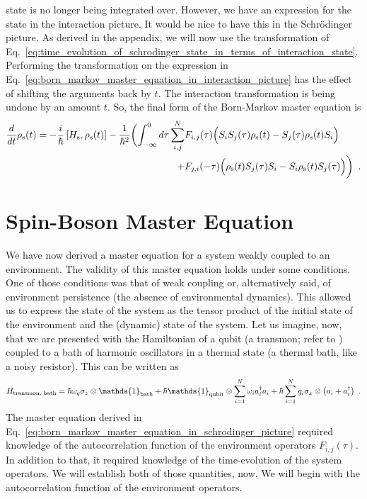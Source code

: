 \documentclass{article}
\begin{document}
state is no longer being integrated over. However, we have an expression for the
state in the interaction picture. It would be nice to have this in the
Schr\"{o}dinger picture. As derived in the appendix, we will now use the
transformation of
Eq.~\ref{eq:time_evolution_of_schrodinger_state_in_terms_of_interaction_state}.
Performing the transformation on the expression in
Eq.~\ref{eq:born_markov_master_equation_in_interaction_picture} has the effect
of shifting the arguments back by $ t $. The interaction transformation is being
undone by an amount $ t $. So, the final form of the Born-Markov master equation
is
\begin{align}
   \frac{d}{dt} \rho_{\textrm{s}}(t)
   = - \frac{i}{\hbar} \left[ H_{\textrm{s}}, \rho_{\textrm{s}}(t) \right] -
   \frac{1}{\hbar^{2}} \biggl( \int_{-\infty}^{0} d\tau \sum^{N}_{i,j}
          & F_{i,j}(\tau) \Bigl(
          S_{i} S_{j}(\tau) \rho_{\textrm{s}}(t)
          - S_{j}(\tau) \rho_{\textrm{s}}(t) S_{i}
       \Bigr) \label{eq:born_markov_master_equation_in_schrodinger_picture} \\
       +  & F_{j,i}(-\tau) \Bigr(
       \rho_{\textrm{s}}(t) S_{j}(\tau) S_{i}
          - S_{i} \rho_{\textrm{s}}(t) S_{j}(\tau)
            \Bigr) \biggr) \nonumber \enskip.
\end{align}

\section{Spin-Boson Master Equation}
\label{sec:spin_boson_master_equation}
We have now derived a master equation for a system weakly coupled to an
environment. The validity of this master equation holds under some conditions. One of those
conditions was that of weak coupling or, alternatively said, of environment persistence (the absence
of environmental dynamics). This allowed us to express the state of the system
as the tensor product of the initial state of the environment and the (dynamic)
state of the system. Let us imagine, now, that we are presented with the
Hamiltonian of a qubit (a transmon; refer to \cite{Bishop2010}) coupled to a
bath of harmonic oscillators in a thermal state (a thermal bath, like a noisy
resistor). This can be written as
\begin{equation}
   H_{\textrm{transmon, bath}} = \hbar \omega_{q} \sigma_{z} \otimes
   \mathds{1}_{\textrm{bath}} + \hbar \mathds{1}_{\textrm{qubit}} \otimes
   \sum^{N}_{i=1} \omega_{i} a_{i}^{\dagger}a_{i}
   + \hbar \sum^{N}_{i=1} g_{i} \sigma_{x} \otimes \bigl(a_{i} +
   a_{i}^{\dagger}\bigr) \enskip.
\end{equation}
The master equation derived in
Eq.~\ref{eq:born_markov_master_equation_in_schrodinger_picture} required
knowledge of the autocorrelation function of the environment operators $
F_{i,j}(\tau) $. In addition to that, it required knowledge of the
time-evolution of the system operators. We will establish both of those
quantities, now. We will begin with the autocorrelation function of the
environment operators.
\end{document}
